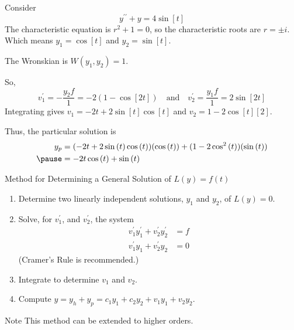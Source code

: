 \documentclass{beamer}
\begin{document}
\begin{frame}
\begin{example}
Consider
\begin{equation*}
y^{\prime\prime}+y=4\sin[t]
\end{equation*}\pause
The characteristic equation is $r^2+1=0$, so the characteristic roots are $r=\pm i$. Which means $y_1=\cos[t]$ and $y_2=\sin[t]$.\pause

\vspace{2mm}
The Wronskian is $W(y_1,y_2)=1$.\pause

\vspace{2mm}
So,
\begin{equation*}
v_1^\prime = -\dfrac{y_2 f}{1} = -2(1-\cos[2t])
\quad\text{and}\quad
v_2^\prime = \dfrac{y_1 f}{1} = 2\sin[2t]
\end{equation*}\pause
Integrating gives $v_1=-2t+2\sin[t]\cos[t]$ and $v_2=1-2\cos[t][2]$.\pause

\vspace{2mm}
Thus, the particular solution is
\begin{equation*}
\begin{aligned}
y_p&=(-2t+2\sin[t]\cos[t])(\cos[t])+(1-2\cos[t][2])(\sin[t])\\\pause
&=-2t\cos[t]+\sin[t]
\end{aligned}
\end{equation*}
\end{example}
\end{frame}

\begin{frame}
\begin{block}{Method for Determining a General Solution of $L(y)=f(t)$}
\begin{enumerate}[<+- | alert@+>]
\item Determine two linearly independent solutions, $y_1$ and $y_2$, of $L(y)=0$.
\item Solve, for $v_1^\prime$, and $v_2^\prime$, the system \begin{equation*}
\begin{aligned}
v_1^\prime y_1^\prime + v_2^\prime y_2^\prime &=f\\
v_1^\prime y_1 + v_2^\prime y_2&=0
\end{aligned}
\end{equation*}
(Cramer's Rule is recommended.)
\item Integrate to determine $v_1$ and $v_2$.
\item Compute $y=y_h+y_p=c_1 y_1+c_2 y_2 + v_1 y_1 + v_2 y_2$.
\end{enumerate}
\onslide<+->
\end{block}
\begin{block}{Note}
This method can be extended to higher orders.
\end{block}
\end{frame}
\end{document}
